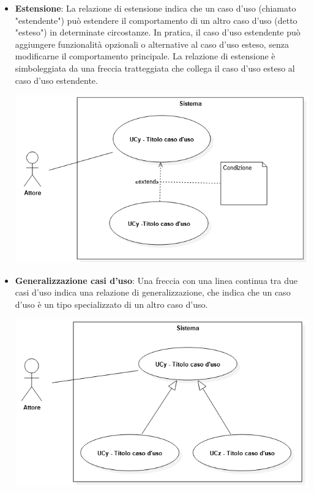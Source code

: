 \begin{itemize}
\begin{itemize}
\begin{center}
		\end{center} \newpage
		\item \textbf{Estensione}: La relazione di estensione indica che un caso d'uso (chiamato "estendente") può estendere il comportamento di un altro caso d'uso (detto "esteso") in determinate circostanze. In pratica, il caso d'uso estendente può aggiungere funzionalità opzionali o alternative al caso d'uso esteso, senza modificarne il comportamento principale. La relazione di estensione è simboleggiata da una freccia tratteggiata che collega il caso d'uso esteso al caso d'uso estendente.
		\begin{center}
			\includegraphics*[width=15cm]{../../../images/norme_di_progetto/estensione.png}
		\end{center} \newpage
		\item \textbf{Generalizzazione casi d'uso}: Una freccia con una linea continua tra due casi d'uso indica una relazione di generalizzazione, che indica che un caso d'uso è un tipo specializzato di un altro caso d'uso.
		\begin{center}
			\includegraphics*[width=15cm]{../../../images/norme_di_progetto/generalizzazioneCasiDiUso.png}
		\end{center}
	\end{itemize}
\end{itemize}

